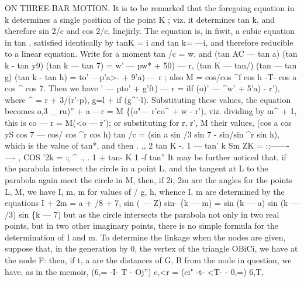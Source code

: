 \documentclass[12pt,a4paper]{article}
\begin{document}
ON THREE-BAR MOTION.
It
is
to be remarked
that
the foregoing equation
in
k
determines a single
position
of
the
point K ;
viz.
it
determines
tan k,
and
therefore
sin
2/c
and
cos 2/c,
linejirly.
The
equation
is,
in
fiwit,
a
cubic
equation
in
tan \guillemotleft{},
satisfied
identically
by tanK = i
and tan k= ---i, and
therefore reducible to a
linear equation.
Write
for a moment
tan
/c = w, and
(tan AC --- tan a) (tan k - tan y9) (tan k --- tan 7) = w' --- pw* + 50) --- r,
(tan K --- tan/) (tan \guillemotleft{} --- tan g) (tan k - tan h) = to' ---p'a>- + 9'a) --- r
;
also
M = cos/cos \textasciicircum{}f cos h -T- cos a cos \textasciicircum{} cos 7.
Then we have
\guillemotleft{}' --- pto' + g'ft) --- r = ilf (o)' --- \textasciicircum{}w' + 5'a) - r'),
where
\textasciicircum{} = r + 3/(r'-p), g=l + if (g\textasciicircum{}'-l).
Substituting these
values, the equation becomes
o,3 \_ ru)'' + a ---r = M \{(o"--- r'co\textasciicircum{} + w - r'),
viz.
dividing by
m\textasciicircum{} + 1,
this
is
co --- r = M(<o --- r');
or
substituting
for
r,
r', M
their
values,
(cos a cos yS cos 7 --- cos/ cos \textasciicircum{}r cos h) tan /c = (sin a sin /3 sin 7 - sin/sin \textasciicircum{}r sin h),
which
is the value
of tan*, and
then
.
,,
2 tan K
-.
1 --- tan' k
Sm ZK = :;-------
----
,
COS '2k =
:;
\textasciicircum{}
.,
.
1 + tan- K
1 -f tan''
It may be
further
noticed
that,
if
the
parabola
intersect the
circle
in
a
point L,
and
the
tangent
at L
to
the
parabola
again
meet
the
circle
in M,
then,
if
2i, 2m
are
the
angles
for
the
points
L,
M,
we
have
I,
m, m
for
values
of /
g,
h,
whence
I, m are determined by the
equations
I + 2m = a + /8 + 7, sin (\guillemotleft{} --- Z) sin- \{k --- m) = sin (k --- a) sin (k --- /3) sin \{k --- 7)
but
as
the
circle
intersects
the
parabola
not
only
in
two
real
points,
but
in
two
other imaginary
points, there
is no simple formula
for the determination of
I and m.
To determine the linkage when the nodes are given, suppose
that,
in
the generation
by
0,
the
vertex
of
the
triangle
OBiCi,
we
have
at
the
node
F:
then,
if
t, a
are the distances
of
G, B from
the node
in
question, we
have,
as
in the memoir,
(6,=
-I- T\guillemotright{} - Oj'') c,<r = (ci" -t- <T- - 0,=) 6,T,
\end{document}
